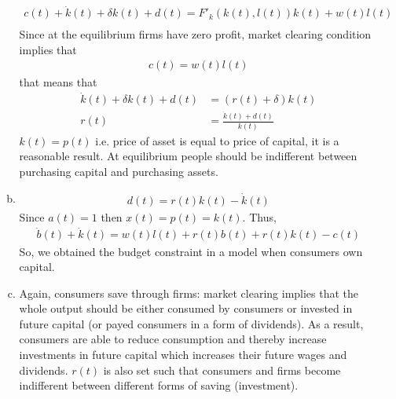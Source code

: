 \documentclass[a4paper]{article}
\begin{document}
\begin{enumerate}[1.]
\begin{enumerate}[(a)]
\begin{align*}
	c(t) + \dot{k}(t) + \delta k(t) + d(t) = F'_k(k(t), l(t))k(t) + w(t)l(t)\\
	\end{align*}
	Since at the equilibrium firms have zero profit, market clearing condition implies that 
	\begin{align*}
	c(t) = w(t)l(t)
	\end{align*}
	that means that
	\begin{align*}
	\dot{k}(t) + \delta k(t) + d(t) &= (r(t) + \delta)k(t)\\
	r(t) &= \frac{\dot{k}(t) + d(t)}{k(t)}
	\end{align*}
	$k(t) = p(t)$ i.e. price of asset is equal to price of capital, it is a reasonable result. At equilibrium people should be indifferent between purchasing capital and purchasing assets.
	\item \begin{align*}
	d(t) = r(t)k(t) - \dot{k}(t)
	\end{align*}
	 Since $a(t) = 1$ then $x(t) = p(t) = k(t)$. Thus,
	\begin{align*}
	\dot{b}(t) + \dot{k}(t) = w(t)l(t) + r(t)b(t) + r(t)k(t) - c(t)
	\end{align*}
	So, we obtained the budget constraint in a model when consumers own capital.
	\item Again, consumers save through firms: market clearing implies that the whole output should be either consumed by consumers or invested in future capital (or payed consumers in a form of dividends). As a result, consumers are able to reduce consumption and thereby increase investments in future capital which increases their future wages and dividends. $r(t)$ is also set such that consumers and firms become indifferent between different forms of saving (investment).
	\end{enumerate}
\end{enumerate}
\end{document}
